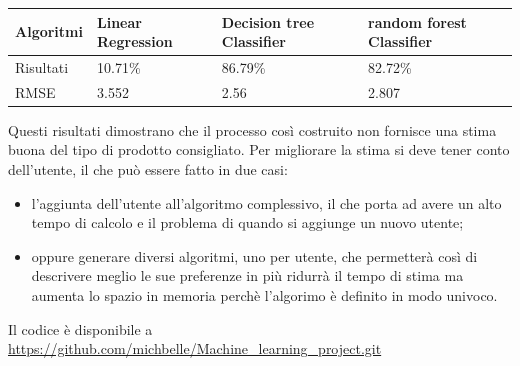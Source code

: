\documentclass{article}
\begin{document}
\begin{tabular}{|p{}|p{}|p{}|p{}|}
\hline
Algoritmi &Linear Regression          & Decision tree Classifier         &random forest Classifier      \\
\hline
Risultati & 10.71\%           & 86.79\%    & 82.72\%          \\
\hline
RMSE &3.552 &2.56 &2.807\\
\hline
\end{tabular}

Questi risultati dimostrano che il processo così costruito non fornisce una stima buona del tipo di prodotto consigliato. Per migliorare la stima si deve tener conto dell'utente, il che può essere fatto in due casi:
\begin{itemize}
\item l'aggiunta dell'utente all'algoritmo complessivo, il che porta ad avere un alto tempo di calcolo e il problema  di quando si aggiunge un nuovo utente;
\item oppure generare diversi algoritmi, uno per utente, che permetterà così di descrivere meglio le sue preferenze in più ridurrà il tempo di stima ma aumenta lo spazio in memoria perchè l'algorimo è definito in modo univoco.
\end{itemize}
Il codice è disponibile a \url{https://github.com/michbelle/Machine_learning_project.git}

\nocite{*}
\printbibliography[title=Bibliografia]{}
\end{document}
